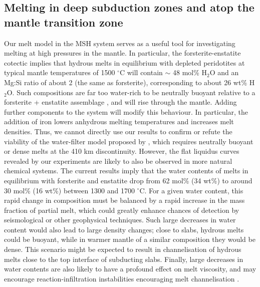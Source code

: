 \documentclass[review]{elsarticle}
\begin{document}
\subsection{Melting in deep subduction zones and atop the mantle transition zone}
Our melt model in the MSH system serves as a useful tool for investigating melting at high pressures in the mantle. In particular, the forsterite-enstatite cotectic implies that hydrous melts in equilibrium with depleted peridotites at typical mantle temperatures of 1500 $^{\circ}$C will contain $\sim$ 48 mol\% H$_2$O and an Mg:Si ratio of about 2 (the same as forsterite), corresponding to about 26 wt\% H$_2$O. Such compositions are far too water-rich to be neutrally buoyant relative to a forsterite + enstatite assemblage \citep{MSK2008}, and will rise through the mantle. Adding further components to the system will modify this behaviour. In particular, the addition of iron lowers anhydrous melting temperatures and increases melt densities. Thus, we cannot directly use our results to confirm or refute the viability of the water-filter model proposed by \cite{BK2003}, which requires neutrally buoyant or dense melts at the 410 km discontinuity. However, the flat liquidus curves revealed by our experiments are likely to also be observed in more natural chemical systems. The current results imply that the water contents of melts in equilibrium with forsterite and enstatite drop from 62 mol\% (34 wt\%) to around 30 mol\% (16 wt\%) between 1300 and 1700 $^{\circ}$C. For a given water content, this rapid change in composition must be balanced by a rapid increase in the mass fraction of partial melt, which could greatly enhance chances of detection by seismological or other geophysical techniques. Such large decreases in water content would also lead to large density changes; close to slabs, hydrous melts could be buoyant, while in warmer mantle of a similar composition they would be dense. This scenario might be expected to result in channelisation of hydrous melts close to the top interface of subducting slabs. Finally, large decreases in water contents are also likely to have a profound effect on melt viscosity, and may encourage reaction-infiltration instabilities encouraging melt channelisation \citep{SKA2001}.



\end{document}
